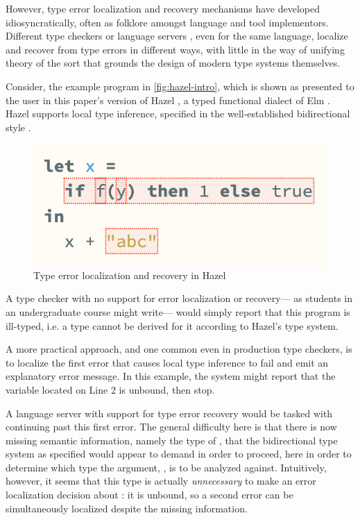 However, type error localization and recovery mechanisms have developed idiosyncratically, 
often as folklore amongst language and tool implementors. 
Different type checkers or language servers \cite{langauge-servers,merlin}, even for the same language, localize and recover from type errors in different ways, 
with little in the way of unifying theory of the sort that grounds the design of modern type systems themselves.

Consider, the example program in \autoref{fig:hazel-intro}, which is shown as presented to the user in
this paper's version of Hazel \cite{hazel}, a typed functional dialect of Elm \cite{elm}. Hazel  
supports local type inference, specified in the well-established bidirectional style \cite{pierce,hazelnut,BidirTyping}.
\begin{figure}
    \includegraphics[scale=0.5]{images/hazel-intro-screenshot.png}
    \caption{Type error localization and recovery in Hazel}
    \label{fig:hazel-intro}
\end{figure}

A type checker with no support for error localization or recovery---%
as students in an undergraduate course might write---%
would simply report that this program is ill-typed, 
i.e. a type cannot be derived for it according to Hazel's type system. 

A more practical approach, and one common even in production type checkers, 
is to localize the first error that causes local type inference to fail and emit an explanatory error message.
In this example, the system might report that the variable  located on Line 2 is unbound, then stop.

A language server with support for type error recovery would 
 be tasked with continuing past this first error.
 The general difficulty here is that there is now missing semantic information, namely the type of , that 
 the bidirectional type system as specified 
 would appear to demand in order to proceed, here in order to determine which type the argument, , is to be analyzed against.
 Intuitively, however, it seems that this type is actually \emph{unnecessary} to make an error localization decision about : 
it is unbound, so a second error can be simultaneously localized despite the missing information.

